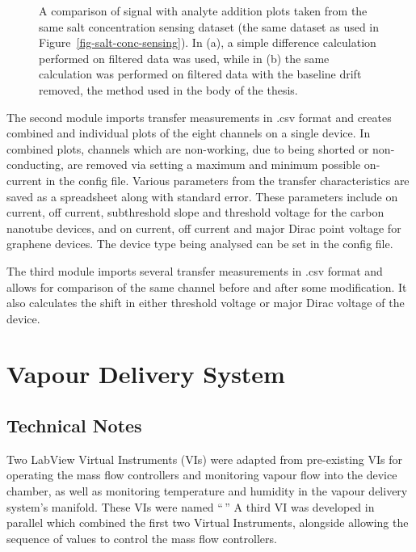 \documentclass[
  a4paper,
]{scrbook}
\begin{document}
\begin{figure}
\begin{minipage}[t]{0.50\linewidth}
{{}

}

\subcaption{\label{fig-spaa-detrend}}
\end{minipage}%

\caption{\label{fig-spaa-plot-comparison}A comparison of signal with
analyte addition plots taken from the same salt concentration sensing
dataset (the same dataset as used in
Figure~\ref{fig-salt-conc-sensing}). In (a), a simple difference
calculation performed on filtered data was used, while in (b) the same
calculation was performed on filtered data with the baseline drift
removed, the method used in the body of the thesis.}

\end{figure}

The second module imports transfer measurements in .csv format and
creates combined and individual plots of the eight channels on a single
device. In combined plots, channels which are non-working, due to being
shorted or non-conducting, are removed via setting a maximum and minimum
possible on-current in the config file. Various parameters from the
transfer characteristics are saved as a spreadsheet along with standard
error. These parameters include on current, off current, subthreshold
slope and threshold voltage for the carbon nanotube devices, and on
current, off current and major Dirac point voltage for graphene devices.
The device type being analysed can be set in the config file.

The third module imports several transfer measurements in .csv format
and allows for comparison of the same channel before and after some
modification. It also calculates the shift in either threshold voltage
or major Dirac voltage of the device.

\hypertarget{vapour-delivery-system}{%
\chapter{Vapour Delivery System}\label{vapour-delivery-system}}

\hypertarget{technical-notes}{%
\section{Technical Notes}\label{technical-notes}}

Two LabView Virtual Instruments (VIs) were adapted from pre-existing VIs
for operating the mass flow controllers and monitoring vapour flow into
the device chamber, as well as monitoring temperature and humidity in
the vapour delivery system's manifold. These VIs were named ``\,'' A
third VI was developed in parallel which combined the first two Virtual
Instruments, alongside allowing the sequence of values to control the
mass flow controllers.
\end{document}
